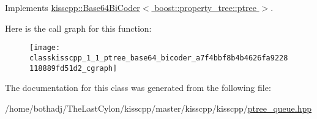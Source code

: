 Implements \hyperlink{classkisscpp_1_1_base64_bi_coder_ade4ace8899f97568458a62df0222b32c}{kisscpp\-::\-Base64\-Bi\-Coder$<$ boost\-::property\-\_\-tree\-::ptree $>$}.



Here is the call graph for this function\-:\nopagebreak
\begin{figure}[H]
\begin{center}
\leavevmode
\texttt{[image: classkisscpp\_1\_1\_ptree\_base64\_bicoder\_a7f4bbf8b4b4626fa9228118889fd51d2\_cgraph]}
\end{center}
\end{figure}




The documentation for this class was generated from the following file\-:\begin{DoxyCompactItemize}
\item 
/home/bothadj/\-The\-Last\-Cylon/kisscpp/master/kisscpp/kisscpp/\hyperlink{ptree__queue_8hpp}{ptree\-\_\-queue.\-hpp}\end{DoxyCompactItemize}
